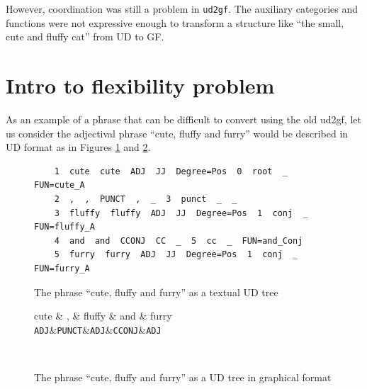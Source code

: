 However, coordination was still a problem in \verb|ud2gf|. The auxiliary categories and functions were not expressive enough to transform a structure like ``the small, cute and fluffy cat'' from UD to GF.





\section{Intro to flexibility problem}

As an example of a phrase that can be difficult to convert using the old ud2gf, let us consider the adjectival phrase ``cute, fluffy and furry''
would be described in UD format as in Figures \ref{fig:ud_cute_text} and \ref{fig:ud_cute}.


\begin{figure}
    \begin{verbatim}
    1  cute  cute  ADJ  JJ  Degree=Pos  0  root  _  FUN=cute_A
    2  ,  ,  PUNCT  ,  _  3  punct  _  _
    3  fluffy  fluffy  ADJ  JJ  Degree=Pos  1  conj  _  FUN=fluffy_A
    4  and  and  CCONJ  CC  _  5  cc  _  FUN=and_Conj
    5  furry  furry  ADJ  JJ  Degree=Pos  1  conj  _  FUN=furry_A
    \end{verbatim}
    \caption{The phrase ``cute, fluffy and furry'' as a textual UD tree}
    \label{fig:ud_cute_text}
\end{figure}

\begin{figure}
    \centering
    \begin{dependency}
        \begin{deptext}[column sep=0.4cm]
              cute \& , \& fluffy \& and \& furry \\
            {\tt ADJ}\&{\tt PUNCT}\&{\tt ADJ}\&{\tt CCONJ}\&{\tt ADJ}\\
        \end{deptext}
    \end{dependency} \\
    \caption{The phrase ``cute, fluffy and furry'' as a UD tree in graphical format}
    \label{fig:ud_cute}
\end{figure}
% 

